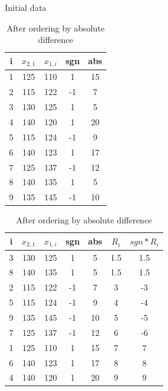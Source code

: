\documentclass[12pt]{article}
\begin{document}
\begin{table}
  \begin{center}
  \begin{minipage}{.5\linewidth}
  \caption{Initial data}
  \begin{tabular}{ccccc}
    \hline
    i & $x_{2, 1}$ & $x_{1, i}$ & sgn & abs \\
    \hline
    1 & 125 & 110 & 1 & 15 \\
    \hline
    2 & 115 & 122 & -1 & 7 \\
    \hline
    3 & 130 & 125 & 1 & 5 \\
    \hline
    4 & 140 & 120 & 1 & 20 \\
    \hline
    5 & 115 & 124 & -1 & 9 \\
    \hline
    6 & 140 & 123 & 1 & 17 \\
    \hline
    7 & 125 & 137 & -1 & 12 \\
    \hline
    8 & 140 & 135 & 1 & 5 \\
    \hline
    9 & 135 & 145 & -1 & 10 \\
    \hline
  \end{tabular}
  \end{minipage}%
  \begin{minipage}{.5\linewidth}
  \caption{After ordering by absolute difference}
  \begin{tabular}{ccccccc}
    \hline
    i & $x_{2, 1}$ & $x_{1, i}$ & sgn & abs & $R_i$ & $sgn * R_i$ \\
    \hline
    3 & 130 & 125 & 1 & 5 & 1.5 & 1.5 \\
    \hline
    8 & 140 & 135 & 1 & 5 & 1.5 & 1.5 \\
    \hline
    2 & 115 & 122 & -1 & 7 & 3 & -3 \\
    \hline
    5 & 115 & 124 & -1 & 9 & 4 & -4 \\
    \hline
    9 & 135 & 145 & -1 & 10 & 5 & -5 \\
    \hline
    7 & 125 & 137 & -1 & 12 & 6 & -6 \\
    \hline
    1 & 125 & 110 & 1 & 15 & 7 & 7 \\
    \hline
    6 & 140 & 123 & 1 & 17 & 8 & 8 \\
    \hline
    4 & 140 & 120 & 1 & 20 & 9 & 9 \\
    \hline
  \end{tabular}
  \end{minipage}%
  \end{center}
\end{table}
\end{document}
